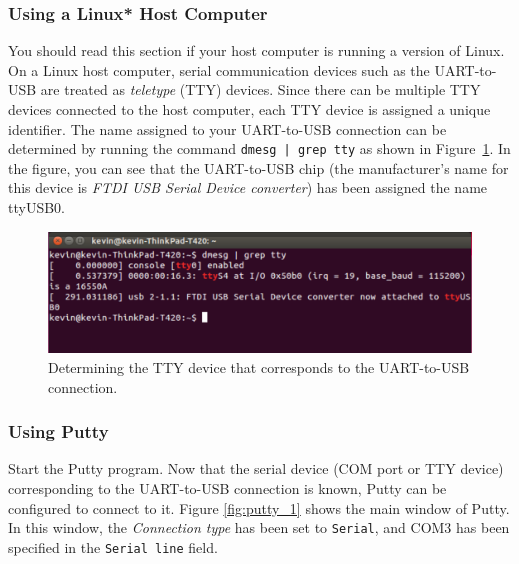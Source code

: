 \documentclass[11pt, twoside, pdftex]{article}
\begin{document}
\subsubsection{Using a Linux* Host Computer}

You should read this section if your host computer is running a version of Linux.
On a Linux host computer, serial communication devices such as the UART-to-USB are treated 
as \textit{teletype} (TTY) devices. Since there can be multiple TTY devices connected to
the host computer, each TTY device is assigned a unique identifier. The name assigned to your 
UART-to-USB connection
can be determined by running the command \texttt{dmesg | grep tty} as shown in 
Figure~\ref{fig:dmesg}. In the figure, you can see that the UART-to-USB chip (the manufacturer's
name for this device is \textit{FTDI USB Serial Device converter}) has been assigned the name 
ttyUSB0.

\begin{figure}[H]
   \begin{center}
       \includegraphics[scale=0.5]{figures/new_tty.png}
   \end{center}
   \caption{Determining the TTY device that corresponds to the UART-to-USB connection.}
	\label{fig:dmesg}
\end{figure}

\subsubsection{Using Putty}

Start the Putty program. Now that the serial device (COM port or TTY device) corresponding to the 
UART-to-USB connection is known, Putty can be configured to connect to it. 
Figure \ref{fig:putty_1} shows the
main window of Putty. In this window, the {\it Connection type} has been set to
\texttt{Serial}, and 
COM3 has been specified in the \texttt{Serial line} field. 
\end{document}
